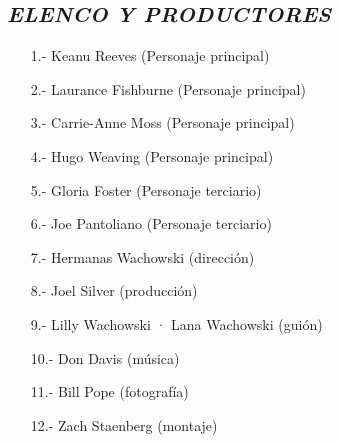 \documentclass[A5paper 11pt]{article}
\begin{document}
\subsection{\textit{ELENCO Y PRODUCTORES}}
  \begin{itemize}
    \item[1.-]Keanu Reeves (Personaje principal)
    \item[2.-]Laurance Fishburne (Personaje principal)
    \item[3.-]Carrie-Anne Moss (Personaje principal)
    \item[4.-]Hugo Weaving (Personaje principal)
    \item[5.-]Gloria Foster (Personaje terciario)
    \item[6.-]Joe Pantoliano (Personaje terciario)
    \item[7.-]Hermanas Wachowski (dirección)
    \item[8.-]Joel Silver (producción)
    \item[9.-]Lilly Wachowski · Lana Wachowski (guión)
    \item[10.-]Don Davis (música)
    \item[11.-]Bill Pope (fotografía)
    \item[12.-]Zach Staenberg (montaje)
  \end{itemize}
  
\newpage
\end{document}
